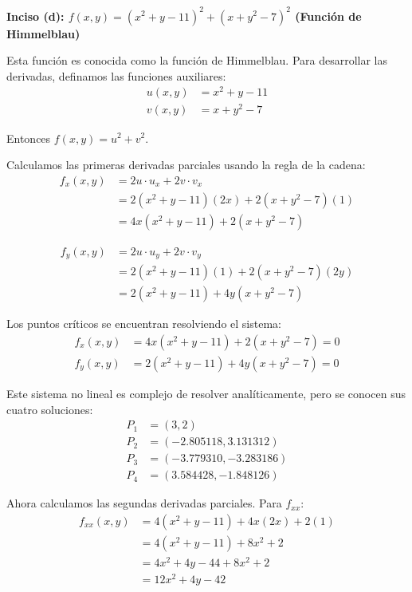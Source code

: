 \documentclass{article}
\begin{document}
\textbf{Inciso (d): $f(x,y) = (x^{2} + y - 11)^{2} + (x + y^{2} - 7)^{2}$ (Función de Himmelblau)}

Esta función es conocida como la función de Himmelblau. Para desarrollar las derivadas, definamos las funciones auxiliares:
\begin{align}
u(x,y) &= x^2 + y - 11 \\
v(x,y) &= x + y^2 - 7
\end{align}

Entonces $f(x,y) = u^2 + v^2$.

Calculamos las primeras derivadas parciales usando la regla de la cadena:
\begin{align}
f_x(x,y) &= 2u \cdot u_x + 2v \cdot v_x \\
&= 2(x^2 + y - 11)(2x) + 2(x + y^2 - 7)(1) \\
&= 4x(x^2 + y - 11) + 2(x + y^2 - 7)
\end{align}

\begin{align}
f_y(x,y) &= 2u \cdot u_y + 2v \cdot v_y \\
&= 2(x^2 + y - 11)(1) + 2(x + y^2 - 7)(2y) \\
&= 2(x^2 + y - 11) + 4y(x + y^2 - 7)
\end{align}

Los puntos críticos se encuentran resolviendo el sistema:
\begin{align}
f_x(x,y) &= 4x(x^2 + y - 11) + 2(x + y^2 - 7) = 0 \\
f_y(x,y) &= 2(x^2 + y - 11) + 4y(x + y^2 - 7) = 0
\end{align}

Este sistema no lineal es complejo de resolver analíticamente, pero se conocen sus cuatro soluciones:
\begin{align}
P_1 &= (3, 2) \\
P_2 &= (-2.805118, 3.131312) \\
P_3 &= (-3.779310, -3.283186) \\
P_4 &= (3.584428, -1.848126)
\end{align}

Ahora calculamos las segundas derivadas parciales. Para $f_{xx}$:
\begin{align}
f_{xx}(x,y) &= 4(x^2 + y - 11) + 4x(2x) + 2(1) \\
&= 4(x^2 + y - 11) + 8x^2 + 2 \\
&= 4x^2 + 4y - 44 + 8x^2 + 2 \\
&= 12x^2 + 4y - 42
\end{align}
\end{document}

